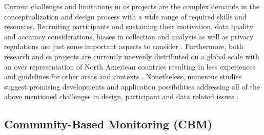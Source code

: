 Current challenges and limitations in \acrshort{cs} projects are the complex demands in the conceptualization and design process with a wide range of required skills and resources. Recruiting participants and sustaining their motivation, data quality and accuracy considerations, biases in collection and analysis as well as privacy regulations are just some important aspects to consider \autocite{fraislCitizenScienceEnvironmental2022}. Furthermore, both research and \acrshort{cs} projects are currently unevenly distributed on a global scale with an over representation of North American countries resulting in less experiences and guidelines for other areas and contexts \autocite{kirschkeCitizenScienceProjects2022, zhengCrowdsourcingMethodsData2018}. Nonetheless, numerous studies suggest promising developments and application possibilities addressing all of the above mentioned challenges in design, participant and data related issues \autocite{buckinghamshumGlobalParticipatoryPlatform2012,buddeParticipatorySensingParticipatory2017,escaECSACharacteristicsCitizen2020,fraislCitizenScienceEnvironmental2022,lowryGrowingPainsCrowdsourced2019,pocockStrategicFrameworkSupport,ruttenHowGetKeep2017,weeserCitizenSciencePioneers2018a}. 

\subsection{Community-Based Monitoring (CBM)}\label{subsec:cbm}

